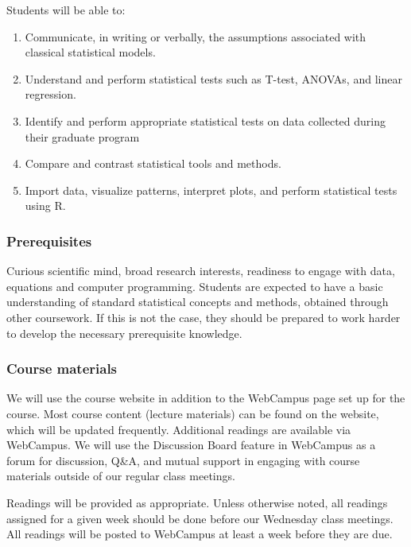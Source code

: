 \documentclass[
]{article}
\providecommand{\tightlist}{%
  \setlength{\itemsep}{0pt}\setlength{\parskip}{0pt}}
\begin{document}
Students will be able to:

\begin{enumerate}
\def\labelenumi{\arabic{enumi}.}
\tightlist
\item
  Communicate, in writing or verbally, the assumptions associated with
  classical statistical models.\\
\item
  Understand and perform statistical tests such as T-test, ANOVAs, and
  linear regression.\\
\item
  Identify and perform appropriate statistical tests on data collected
  during their graduate program\\
\item
  Compare and contrast statistical tools and methods.\\
\item
  Import data, visualize patterns, interpret plots, and perform
  statistical tests using R.
\end{enumerate}

\hypertarget{prerequisites}{%
\subsubsection{Prerequisites}\label{prerequisites}}

Curious scientific mind, broad research interests, readiness to engage
with data, equations and computer programming. Students are expected to
have a basic understanding of standard statistical concepts and methods,
obtained through other coursework. If this is not the case, they should
be prepared to work harder to develop the necessary prerequisite
knowledge.

\hypertarget{course-materials}{%
\subsubsection{Course materials}\label{course-materials}}

We will use the course website in addition to the WebCampus page set up
for the course. Most course content (lecture materials) can be found on
the website, which will be updated frequently. Additional readings are
available via WebCampus. We will use the Discussion Board feature in
WebCampus as a forum for discussion, Q\&A, and mutual support in
engaging with course materials outside of our regular class meetings.

Readings will be provided as appropriate. Unless otherwise noted, all
readings assigned for a given week should be done before our Wednesday
class meetings. All readings will be posted to WebCampus at least a week
before they are due.
\end{document}
